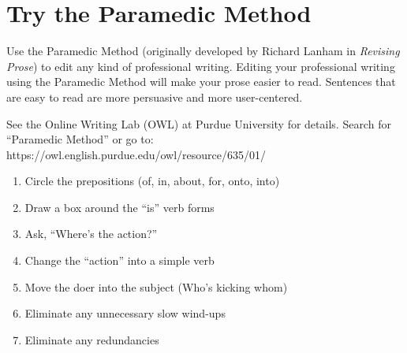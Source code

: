 \documentclass[11pt,twocolumn]{article}
\begin{document}
\section{Try the Paramedic Method}

Use the Paramedic Method (originally developed by Richard Lanham in
\emph{Revising Prose}) to edit any kind of professional writing. Editing
your professional writing using the Paramedic Method will make your
prose easier to read. Sentences that are easy to read are more
persuasive and more user-centered.

See the Online Writing Lab (OWL) at Purdue University for details.
Search for “Paramedic Method” or go to:
https://owl.english.purdue.edu/owl/resource/635/01/

\begin{enumerate}
\item Circle the prepositions (of, in, about, for, onto, into)
\item Draw a box around the “is” verb forms
\item Ask, “Where's the action?”
\item Change the “action” into a simple verb
\item Move the doer into the subject (Who's kicking whom)
\item Eliminate any unnecessary slow wind-ups
\item Eliminate any redundancies
\end{enumerate}
\end{document}
